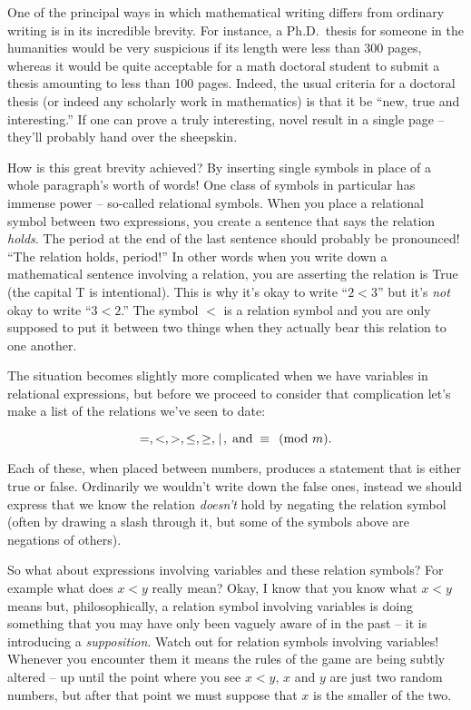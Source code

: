 One of the principal ways in which mathematical writing
differs from ordinary writing is in its incredible brevity.  For
instance, a Ph.D.\ thesis for someone in the humanities would be very 
suspicious if its length were less than 300 pages, whereas it would
be quite acceptable for a math doctoral student to submit a thesis
amounting to less than 100 pages.  Indeed, the usual criteria for
a doctoral thesis (or indeed any scholarly work in mathematics) is
that it be ``new, true and interesting.''  If one can prove a truly 
interesting, novel result in a single page -- they'll probably hand over 
the sheepskin.

How is this great brevity achieved?  By inserting single symbols in place
of a whole paragraph's worth of words!  One class of symbols in particular
has immense power -- so-called  relational symbols.  
When you place a relational
symbol between two expressions, you create a sentence that says the
relation \emph{holds}.  The period at the end of the last sentence should
probably be pronounced!  ``The relation holds, period!''  In other words
when you write down a mathematical sentence involving a relation, you 
are asserting the relation is True (the capital T is intentional).
This is why it's okay to write ``$2 < 3$'' but it's \emph{not} okay to
write ``$3 < 2$.''  The symbol $<$ is a relation symbol and you are
only supposed to put it between two things when they actually bear this
relation to one another.

The situation becomes slightly more complicated when we have 
variables in relational expressions, but before we proceed to
consider that complication let's make a list of the relations
we've seen to date:

\[ =, <, >, \leq, \geq,\; \!\mid\! \; , \; \mbox{and} \; \equiv \pmod{m}. \] 

Each of these, when placed between numbers, produces a statement that
is either true or false.  Ordinarily we wouldn't write down the 
false ones, instead we should express that we know the relation
\emph{doesn't} hold by negating the relation symbol (often by
drawing a slash through it, but some of the symbols above are
negations of others).

So what about expressions involving variables and these relation symbols?
For example what does $x < y$ really mean?  Okay, I know that you know 
what $x < y$ means but, philosophically, a relation symbol involving variables
is doing something that you may have only been vaguely aware of in the 
past -- it is introducing a \emph{supposition}.  Watch out for relation
symbols involving variables!  Whenever you encounter them it means the 
rules of the game are being subtly altered -- up until the point where 
you see $x < y$, $x$ and $y$ are just two random numbers, but after that
point we must suppose that $x$ is the smaller of the two.

